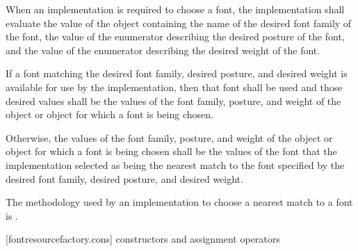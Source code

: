 \pnum
When an implementation is required to choose a font, the implementation shall evaluate the value of the  object containing the name of the desired font family of the font, the value of the  enumerator describing the desired posture of the font, and the value of the  enumerator describing the desired weight of the font.

\pnum
If a font matching the desired font family, desired posture, and desired weight is available for use by the implementation, then that font shall be used and those desired values shall be the values of the font family, posture, and weight of the  object or  object for which a font is being chosen.

\pnum
Otherwise, the values of the font family, posture, and weight of the  object or  object for which a font is being chosen shall be the values of the font that the implementation selected as being the nearest match to the font specified by the desired font family, desired posture, and desired weight.

\pnum
The methodology used by an implementation to choose a nearest match to a font is \unspecnorm.

 [fontresourcefactory.cons] { constructors and assignment operators}

